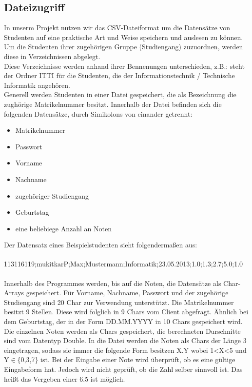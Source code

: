 \documentclass{scrartcl}
\begin{document}
	\subsection{Dateizugriff}
		In unserm Projekt nutzen wir das CSV-Dateiformat um die Datensätze von Studenten auf eine praktische Art und Weise speichern und auslesen zu können. Um die Studenten ihrer zugehörigen Gruppe (Studiengang) zuzuordnen, werden diese in Verzeichnissen abgelegt. \\
		Diese Verzeichnisse werden anhand ihrer Bennenungen unterschieden, z.B.: steht der Ordner ITTI für die Studenten, die der Informationstechnik / Technische Informatik angehören.\\
		Generell werden Studenten in einer Datei gespeichert, die als Bezeichnung die zughörige Matrikelnummer besitzt. Innerhalb der Datei befinden sich die folgenden Datensätze, durch Simikolons von einander getrennt:\\
		\begin{itemize}
			\item Matrikelnummer
			\item Passwort
			\item Vorname
			\item Nachname
			\item zugehöriger Studiengang
			\item Geburtstag
			\item eine beliebiege Anzahl an Noten
		\end{itemize}
		Der Datensatz eines Beispielstudenten sieht folgendermaßen aus:\\
		 \\
		113116119;mukitkarP;Max;Mustermann;Informatik;23.05.2013;1.0;1.3;2.7;5.0;1.0\\
		 \\
		Innerhalb des Programmes werden, bis auf die Noten, die Datensätze als Char-Arrays gespeichert. Für Vorname, Nachname, Passwort und der zugehörige Studiengang sind 20 Char zur Verwendung unterstützt. Die Matrikelnummer besitzt 9 Stellen. Diese wird folglich in 9 Chars vom Client abgefragt. Ähnlich bei dem Geburtstag, der in der Form DD.MM.YYYY in 10 Chars gespeichert wird. \\
		Die einzelnen Noten werden als Chars gespeichert, die berechneten Durschnitte sind vom Datentyp Double. In die Datei werden die Noten als Chars der Länge 3 eingetragen, sodass sie immer die folgende Form besitzen X.Y wobei 1<X<5 und Y$\in \{$0,3,7$\}$ ist. Bei der Eingabe einer Note wird überprüft, ob es eine gültige Eingabeform hat. Jedoch wird nicht geprüft, ob die Zahl selber sinnvoll ist. Das heißt das Vergeben einer 6.5 ist möglich.\\
		
\end{document}

